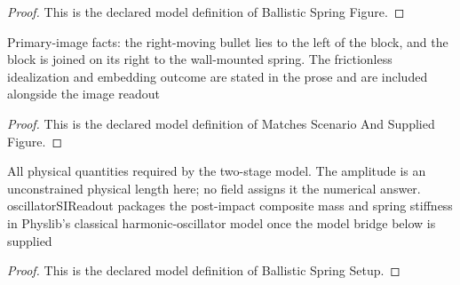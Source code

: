 \begin{proof}
  This is the declared model definition of Ballistic Spring Figure.
\end{proof}
\begin{definition}
  \label{def:physics:phyx-mini-0260:phyxminiproblems-problemphyxmini0260-matchesscenarioandsuppliedfigure}
  Primary-image facts: the right-moving bullet lies to the left of the block, and the block is joined on its right to the wall-mounted spring. The frictionless idealization and embedding outcome are stated in the prose and are included alongside the image readout
\end{definition}
\begin{proof}
  This is the declared model definition of Matches Scenario And Supplied Figure.
\end{proof}
\begin{definition}
  \label{def:physics:phyx-mini-0260:phyxminiproblems-problemphyxmini0260-ballisticspringsetup}
  All physical quantities required by the two-stage model. The amplitude is an unconstrained physical length here; no field assigns it the numerical answer. oscillatorSIReadout packages the post-impact composite mass and spring stiffness in Physlib's classical harmonic-oscillator model once the model bridge below is supplied
\end{definition}
\begin{proof}
  This is the declared model definition of Ballistic Spring Setup.
\end{proof}
